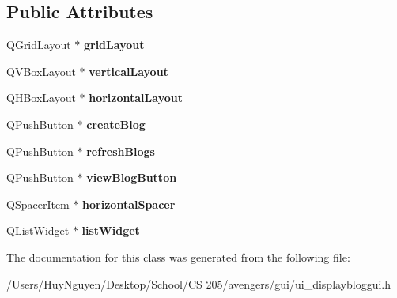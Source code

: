 \subsection*{Public Attributes}
\begin{DoxyCompactItemize}
\item 
Q\+Grid\+Layout $\ast$ {\bfseries grid\+Layout}\hypertarget{classUi__DisplayBlogGUI_afb71119e6ee3aec0d6bf40ef79faff25}{}\label{classUi__DisplayBlogGUI_afb71119e6ee3aec0d6bf40ef79faff25}

\item 
Q\+V\+Box\+Layout $\ast$ {\bfseries vertical\+Layout}\hypertarget{classUi__DisplayBlogGUI_a47a9cdfdcaee55d4f8d5e46ca6733a79}{}\label{classUi__DisplayBlogGUI_a47a9cdfdcaee55d4f8d5e46ca6733a79}

\item 
Q\+H\+Box\+Layout $\ast$ {\bfseries horizontal\+Layout}\hypertarget{classUi__DisplayBlogGUI_af635541e4d9573b21020f6f64b24d440}{}\label{classUi__DisplayBlogGUI_af635541e4d9573b21020f6f64b24d440}

\item 
Q\+Push\+Button $\ast$ {\bfseries create\+Blog}\hypertarget{classUi__DisplayBlogGUI_a647556faa04b78db709317a32910efcb}{}\label{classUi__DisplayBlogGUI_a647556faa04b78db709317a32910efcb}

\item 
Q\+Push\+Button $\ast$ {\bfseries refresh\+Blogs}\hypertarget{classUi__DisplayBlogGUI_aee4ff8cb5e32e5975adee08c85a10ab0}{}\label{classUi__DisplayBlogGUI_aee4ff8cb5e32e5975adee08c85a10ab0}

\item 
Q\+Push\+Button $\ast$ {\bfseries view\+Blog\+Button}\hypertarget{classUi__DisplayBlogGUI_a781ec81a4f92ff4bce6fb9159bcdc18d}{}\label{classUi__DisplayBlogGUI_a781ec81a4f92ff4bce6fb9159bcdc18d}

\item 
Q\+Spacer\+Item $\ast$ {\bfseries horizontal\+Spacer}\hypertarget{classUi__DisplayBlogGUI_a584a7f77e967d859432597a2a2d95044}{}\label{classUi__DisplayBlogGUI_a584a7f77e967d859432597a2a2d95044}

\item 
Q\+List\+Widget $\ast$ {\bfseries list\+Widget}\hypertarget{classUi__DisplayBlogGUI_a7d5d2f1b7ed4cfae52a512f7b432db9f}{}\label{classUi__DisplayBlogGUI_a7d5d2f1b7ed4cfae52a512f7b432db9f}

\end{DoxyCompactItemize}


The documentation for this class was generated from the following file\+:\begin{DoxyCompactItemize}
\item 
/\+Users/\+Huy\+Nguyen/\+Desktop/\+School/\+C\+S 205/avengers/gui/ui\+\_\+displaybloggui.\+h\end{DoxyCompactItemize}

